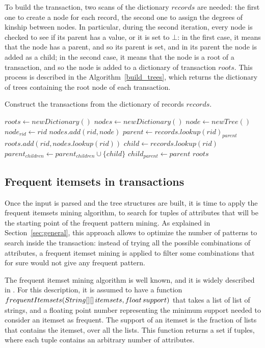 \documentclass{acm_proc_article-sp-sigmod09}
\begin{document}
To build the transaction, two scans of the dictionary $records$ are needed: the first one to create a node for each record, the second one to assign the degrees of kinship between nodes. In particular, during the second iteration, every node is checked to see if its parent has a value, or it is set to $\bot$: in the first case, it means that the node has a parent, and so its parent is set, and in its parent the node is added as a child; in the second case, it means that the node is a root of a transaction, and so the node is added to a dictionary of transaction $roots$. This process is described in the Algorithm~\ref{build_trees}, which returns the dictionary of trees containing the root node of each transaction.

\begin{algorithm}
\caption{Construct the transactions from the dictionary of records $records$.}
\label{build_trees}
\begin{algorithmic}[1]
\State $roots \gets new Dictionary()$
\State $nodes \gets new Dictionary()$
	\State $node \gets new Tree()$ 
	\State $node_{rid} \gets rid$
	\State $nodes.add(rid, node)$
\EndFor
{}
	\State $parent \gets records.lookup(rid)_{parent}$
		\State $roots.add(rid, nodes.lookup(rid))$
	\Else
		\State $child \gets records.lookup(rid)$
		\State $parent_{children} \gets parent_{children} \cup \{child\}$
		\State $child_{parent} \gets parent$
	\EndIf
\EndFor
\Return $roots$
\EndFunction
\end{algorithmic}
\end{algorithm}

\subsection{Frequent itemsets in transactions} \label{freqsettra}
Once the input is parsed and the tree structures are built, it is time to apply the frequent itemsets mining algorithm, to search for tuples of attributes that will be the starting point of the frequent pattern mining. As explained in Section~\ref{sec:general}, this approach allows to optimize the number of patterns to search inside the transaction: instead of trying all the possible combinations of attributes, a frequent itemset mining is applied to filter some combinations that for sure would not give any frequent pattern.

The frequent itemset mining algorithm is well known, and it is widely described in \cite{agrawal1994fast}. For this description, it is assumed to have a function $frequentItemsets(String[][]\, item\-sets, float\, sup\-port)$ that takes a list of list of strings, and a floating point number representing the minimum support needed to consider an itemset as frequent. The support of an itemset is the fraction of lists that contains the itemset, over all the lists. This function returns a set if tuples, where each tuple contains an arbitrary number of attributes.
\end{document}
